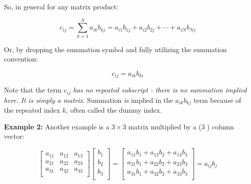 \begin{displayquote}
So, in general for any matrix product:

\begin{equation}
	c_{ij} = \sum_{k=1}^{N} a_{ik}b_{kj} = a_{i1}b_{1j} + a_{i2}b_{2j} + \cdots +  a_{iN}b_{Nj}
	\label{eq:MatrixMultiply}
\end{equation}

Or, by dropping the summation symbol and fully utilizing the summation convention:

\begin{equation}
	c_{ij} = a_{ik}b_{ki}
\end{equation}

Note that the term $c_{ij}$ \emph{has no repeated subscript - there is no summation implied here. It is simply a matrix}. Summation \emph{is} implied in the $a_{ik}b_{kj}$ term because of the repeated index $k$, often called the dummy index.
\end{displayquote}

\begin{displayquote}
	\textbf{Example 2:} Another example is a $3 \times 3$ matrix multiplied by a (3 ) column vector:

\begin{equation}
	\begin{bmatrix}
		a_{11} & a_{12} & a_{13}\\
		a_{21} & a_{22} & a_{23}\\
		a_{31} & a_{32} & a_{33}\\
	\end{bmatrix}
	\begin{bmatrix}
		b_1\\
		b_2\\
		b_3\\
	\end{bmatrix}
	=
	\begin{bmatrix}
		a_{11}b_{1} + a_{12}b_{2} + a_{13}b_{3} \\
		a_{21}b_{1} + a_{22}b_{2} + a_{23}b_{3}\\
		a_{31}b_{1} + a_{32}b_{2} + a_{33}b_{3}\\
	\end{bmatrix}
	= a_{ij}b_{j}
\end{equation}
\end{displayquote}


